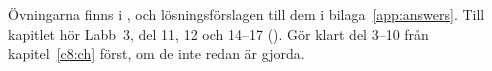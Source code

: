 Övningarna finns i , och lösningsförslagen till dem i
bilaga~\ref{app:answers}. Till kapitlet hör Labb~3, del 11, 12 och 14--17 ().
Gör klart del 3--10 från kapitel~\ref{c8:ch} först, om de inte redan är gjorda.





